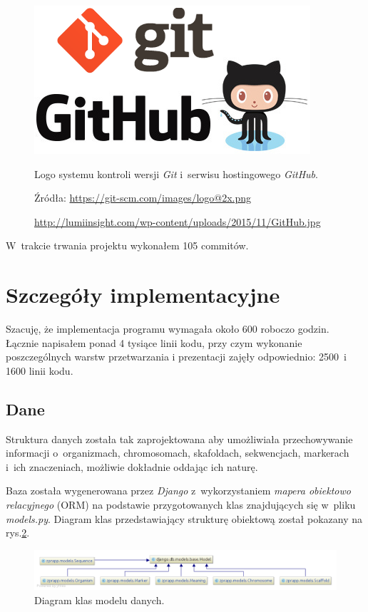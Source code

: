 \documentclass[a4paper,12pt,oneside]{mwrep}  %
\begin{document}
\begin{figure}[]
\centering
\includegraphics[width=1\textwidth/2]{grafika/loga/git_github_pionowo.png}
\caption{Logo systemu kontroli wersji \emph{Git} i~serwisu hostingowego \emph{GitHub}.}
\vspace{-0.8cm}
\caption*{\scriptsize \hspace{-4.7cm} Źródła: \url{https://git-scm.com/images/logo@2x.png}}
\vspace{-0.8cm}
\caption*{\scriptsize \url{http://lumiinsight.com/wp-content/uploads/2015/11/GitHub.jpg}}
\label{logo_git_github}
\end{figure}

W~trakcie trwania projektu wykonałem 105 commitów.

\section{Szczegóły implementacyjne}

Szacuję, że implementacja programu wymagała około 600 roboczo godzin.
Łącznie napisałem ponad 4 tysiące linii kodu, przy czym wykonanie poszczególnych warstw przetwarzania i prezentacji zajęły odpowiednio: 2500~i 1600 linii kodu.

\subsection{Dane}
Struktura danych została tak zaprojektowana aby umożliwiała przechowywanie informacji o~organizmach, chromosomach, skafoldach, sekwencjach, markerach i~ich znaczeniach, możliwie dokładnie oddając ich naturę.

Baza została wygenerowana przez \emph{Django} z~wykorzystaniem \emph{mapera obiektowo relacyjnego} (ORM) na podstawie przygotowanych klas znajdujących się w~pliku \emph{models.py}. Diagram klas przedstawiający strukturę obiektową został pokazany na rys.\ref{diagram_klas_modelu}.
\begin{figure}[b]
\centering
\includegraphics[width=1\textwidth]{grafika/model/final/model_diagram_klas2.png}
\caption{Diagram klas modelu danych.}
\label{diagram_klas_modelu}
\end{figure}
\end{document}
